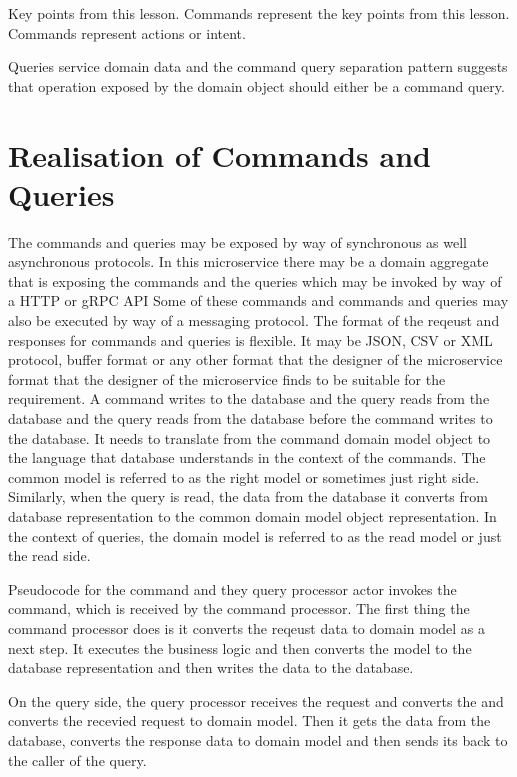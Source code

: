 Key points from this lesson.
Commands represent the key points from this lesson.
Commands represent actions or intent.

Queries service domain data and the command query separation pattern suggests that operation exposed by the domain object should either be a command query.

\section{Realisation of Commands and Queries}

The commands and queries may be exposed by way of synchronous as well asynchronous protocols.
In this microservice there may be a domain aggregate that is exposing the commands and the queries which may be invoked by way of a HTTP or gRPC API
Some of these commands and commands and queries may also be executed by way of a messaging protocol.
The format of the reqeust and responses for commands and queries is flexible.
It may be JSON, CSV or XML protocol, buffer format or any other format that the designer of the microservice format that the designer of the microservice finds to be suitable for the requirement.
A command writes to the database and the query reads from the database and the query reads from the database before the command writes to the database.
It needs to translate from the command domain model object to the language that database understands in the context of the commands.
The common model is referred to as the right model or sometimes just right side.
Similarly, when the query is read, the data from the database it converts from database representation to the common domain model object representation.
In the context of queries, the domain model is referred to as the read model or just the read side.

Pseudocode for the command and they query processor actor invokes the command, which is received by the command processor.
The first thing the command processor does is it converts the reqeust data to domain model as a next step.
It executes the business logic and then converts the model to the database representation and then writes the data to the database.

On the query side, the query processor receives the request and converts the and converts the recevied request to domain model.
Then it gets the data from the database, converts the response data to domain model and then sends its back to the caller of the query.


